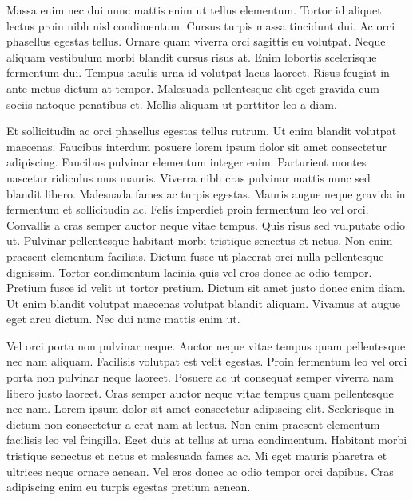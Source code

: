 Massa enim nec dui nunc mattis enim ut tellus elementum. Tortor id aliquet
lectus proin nibh nisl condimentum. Cursus turpis massa tincidunt dui. Ac orci
phasellus egestas tellus. Ornare quam viverra orci sagittis eu volutpat. Neque
aliquam vestibulum morbi blandit cursus risus at. Enim lobortis scelerisque
fermentum dui. Tempus iaculis urna id volutpat lacus laoreet. Risus feugiat in
ante metus dictum at tempor. Malesuada pellentesque elit eget gravida cum sociis
natoque penatibus et. Mollis aliquam ut porttitor leo a diam.

Et sollicitudin ac orci phasellus egestas tellus rutrum. Ut enim blandit
volutpat maecenas. Faucibus interdum posuere lorem ipsum dolor sit amet
consectetur adipiscing. Faucibus pulvinar elementum integer enim. Parturient
montes nascetur ridiculus mus mauris. Viverra nibh cras pulvinar mattis nunc sed
blandit libero. Malesuada fames ac turpis egestas. Mauris augue neque gravida in
fermentum et sollicitudin ac. Felis imperdiet proin fermentum leo vel orci.
Convallis a cras semper auctor neque vitae tempus. Quis risus sed vulputate odio
ut. Pulvinar pellentesque habitant morbi tristique senectus et netus. Non enim
praesent elementum facilisis. Dictum fusce ut placerat orci nulla pellentesque
dignissim. Tortor condimentum lacinia quis vel eros donec ac odio tempor.
Pretium fusce id velit ut tortor pretium. Dictum sit amet justo donec enim diam.
Ut enim blandit volutpat maecenas volutpat blandit aliquam. Vivamus at augue
eget arcu dictum. Nec dui nunc mattis enim ut.

Vel orci porta non pulvinar neque. Auctor neque vitae tempus quam pellentesque
nec nam aliquam. Facilisis volutpat est velit egestas. Proin fermentum leo vel
orci porta non pulvinar neque laoreet. Posuere ac ut consequat semper viverra
nam libero justo laoreet. Cras semper auctor neque vitae tempus quam
pellentesque nec nam. Lorem ipsum dolor sit amet consectetur adipiscing elit.
Scelerisque in dictum non consectetur a erat nam at lectus. Non enim praesent
elementum facilisis leo vel fringilla. Eget duis at tellus at urna condimentum.
Habitant morbi tristique senectus et netus et malesuada fames ac. Mi eget mauris
pharetra et ultrices neque ornare aenean. Vel eros donec ac odio tempor orci
dapibus. Cras adipiscing enim eu turpis egestas pretium aenean.

